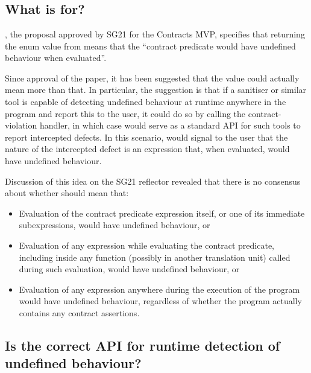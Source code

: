 \section{}
\label{sec:ub}

\subsection{What is  for?}
\label{subsec:reasons}

\cite{P2811R5}, the proposal approved by SG21 for the Contracts MVP, specifies that returning the enum value \mbox{} from \mbox{} means that the ``contract predicate would have undefined behaviour when evaluated''.

Since approval of the paper, it has been suggested that the value could actually mean more than that. In particular, the suggestion is that if a sanitiser or similar tool is capable of detecting undefined behaviour at runtime anywhere in the program and report this to the user, it could do so by calling the contract-violation handler, in which case  would serve as a standard API for such tools to report intercepted defects. In this scenario, \mbox{} would signal to the user that the nature of the intercepted defect is an expression that, when evaluated, would have undefined behaviour.

Discussion of this idea on the SG21 reflector revealed that there is no consensus about whether  should mean that:
\begin{itemize}
\item Evaluation of the contract predicate expression itself, or one of its immediate subexpressions, would have undefined behaviour, or
\item Evaluation of any expression while evaluating the contract predicate, including inside any function (possibly in another translation unit) called during such evaluation, would have undefined behaviour, or
\item Evaluation of any expression anywhere during the execution of the program would have undefined behaviour, regardless of whether the program actually contains any contract assertions.
\end{itemize}

\subsection{Is  the correct API for runtime detection of undefined behaviour?}

